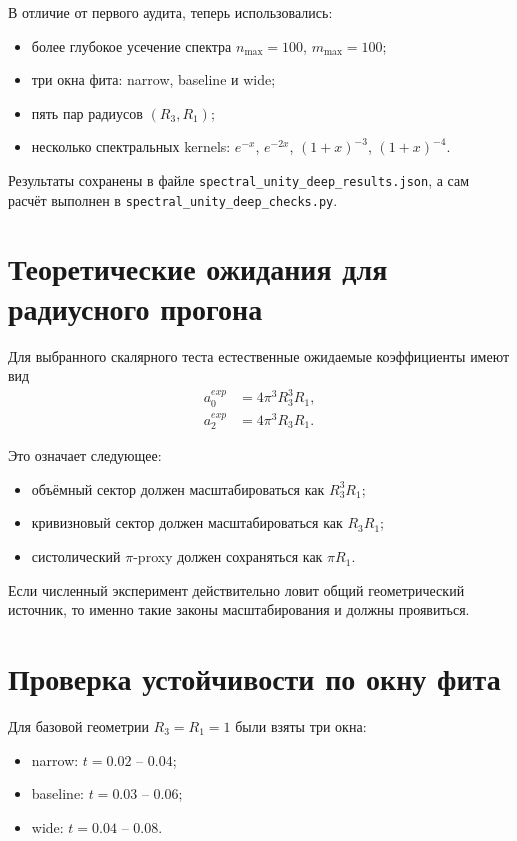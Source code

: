 \documentclass[12pt,a4paper]{article}
\begin{document}
В отличие от первого аудита, теперь использовались:
\begin{itemize}
    \item более глубокое усечение спектра \(n_{\max}=100\), \(m_{\max}=100\);
    \item три окна фита: narrow, baseline и wide;
    \item пять пар радиусов \((R_3,R_1)\);
    \item несколько спектральных kernels: \(e^{-x}\), \(e^{-2x}\), \((1+x)^{-3}\), \((1+x)^{-4}\).
\end{itemize}

Результаты сохранены в файле \texttt{spectral\_unity\_deep\_results.json}, а сам расчёт выполнен в \texttt{spectral\_unity\_deep\_checks.py}.

\section{Теоретические ожидания для радиусного прогона}

Для выбранного скалярного теста естественные ожидаемые коэффициенты имеют вид
\begin{align}
 a_0^{exp} &= 4\pi^3 R_3^3 R_1,\\
 a_2^{exp} &= 4\pi^3 R_3 R_1.
\end{align}

Это означает следующее:
\begin{itemize}
    \item объёмный сектор должен масштабироваться как \(R_3^3R_1\);
    \item кривизновый сектор должен масштабироваться как \(R_3R_1\);
    \item систолический \(\pi\)-proxy должен сохраняться как \(\pi R_1\).
\end{itemize}

Если численный эксперимент действительно ловит общий геометрический источник, то именно такие законы масштабирования и должны проявиться.

\section{Проверка устойчивости по окну фита}

Для базовой геометрии \(R_3=R_1=1\) были взяты три окна:
\begin{itemize}
    \item narrow: \(t=0.02\) -- \(0.04\);
    \item baseline: \(t=0.03\) -- \(0.06\);
    \item wide: \(t=0.04\) -- \(0.08\).
\end{itemize}
\end{document}
